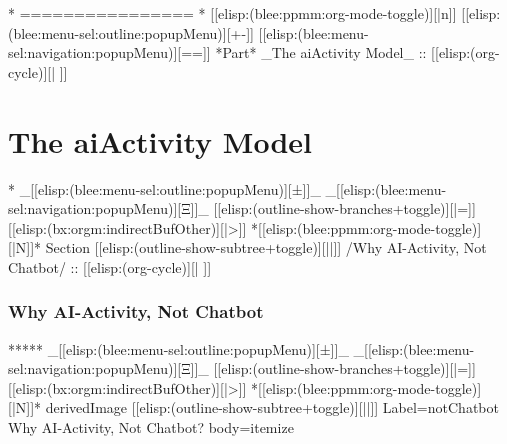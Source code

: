 \begin{whenOrg}
\begin{verblatex}
\begin{frame}[fragile,plain,label=noLayeringYet]
{}

\end{frame}
\end{verblatex}



\begin{whenOrg}
*      ================
*  [[elisp:(blee:ppmm:org-mode-toggle)][|n]] [[elisp:(blee:menu-sel:outline:popupMenu)][+-]] [[elisp:(blee:menu-sel:navigation:popupMenu)][==]]  *Part*   _The aiActivity Model_ ::  [[elisp:(org-cycle)][| ]]
\end{whenOrg}

\newpage
\part{The aiActivity Model}

\begin{whenOrg}
*  _[[elisp:(blee:menu-sel:outline:popupMenu)][±]]_ _[[elisp:(blee:menu-sel:navigation:popupMenu)][Ξ]]_ [[elisp:(outline-show-branches+toggle)][|=]] [[elisp:(bx:orgm:indirectBufOther)][|>]] *[[elisp:(blee:ppmm:org-mode-toggle)][|N]]*  Section    [[elisp:(outline-show-subtree+toggle)][||]]   /Why AI-Activity, Not Chatbot/ ::  [[elisp:(org-cycle)][| ]]
\end{whenOrg}

\section{Why AI-Activity, Not Chatbot}

\begin{whenOrg}
*****  _[[elisp:(blee:menu-sel:outline:popupMenu)][±]]_ _[[elisp:(blee:menu-sel:navigation:popupMenu)][Ξ]]_ [[elisp:(outline-show-branches+toggle)][|=]] [[elisp:(bx:orgm:indirectBufOther)][|>]] *[[elisp:(blee:ppmm:org-mode-toggle)][|N]]*  derivedImage [[elisp:(outline-show-subtree+toggle)][||]] Label=notChatbot Why AI-Activity, Not Chatbot? body=itemize
\end{whenOrg}


\end{whenOrg}
